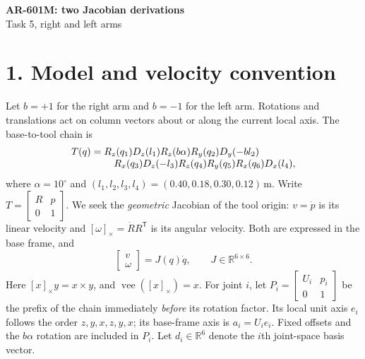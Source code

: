 \documentclass[10pt,a4paper]{article}
\begin{document}
\begin{center}
  {\Large\bfseries AR-601M: two Jacobian derivations}\\[3pt]
  Task 5, right and left arms
\end{center}

\section*{1. Model and velocity convention}
Let $b=+1$ for the right arm and $b=-1$ for the left arm. Rotations and
translations act on column vectors about or along the current local axis.
The base-to-tool chain is
\begin{align}
T(q)={}&R_z(q_1)D_z(l_1)R_z(b\alpha)R_y(q_2)D_y(-b l_2)
\notag\\[-3pt]
&\quad R_x(q_3)D_z(-l_3)R_z(q_4)R_y(q_5)R_x(q_6)D_x(l_4),
\end{align}
where $\alpha=10^\circ$ and $(l_1,l_2,l_3,l_4)=(0.40,0.18,0.30,0.12)$\,m.
Write $T=\begin{bmatrix}R&p\\0&1\end{bmatrix}$. We seek the \emph{geometric}
Jacobian of the tool origin: $v=\dot p$ is its linear velocity and
$[\omega]_\times=\dot R R^\mathsf{T}$ is its angular velocity. Both are
expressed in the base frame, and
\begin{equation}
\begin{bmatrix}v\\\omega\end{bmatrix}=J(q)\dot q,
\qquad J\in\mathbb R^{6\times6}.
\label{eq:target}
\end{equation}
Here $[x]_\times y=x\times y$, and $\operatorname{vee}([x]_\times)=x$.
For joint $i$, let $P_i=\begin{bmatrix}U_i&p_i\\0&1\end{bmatrix}$ be the
prefix of the chain immediately \emph{before} its rotation factor. Its local
unit axis $e_i$ follows the order $z,y,x,z,y,x$; its base-frame axis is
$a_i=U_i e_i$. Fixed offsets and the $b\alpha$ rotation are included in
$P_i$. Let $d_i\in\mathbb R^6$ denote the $i$th joint-space basis vector.
\end{document}
